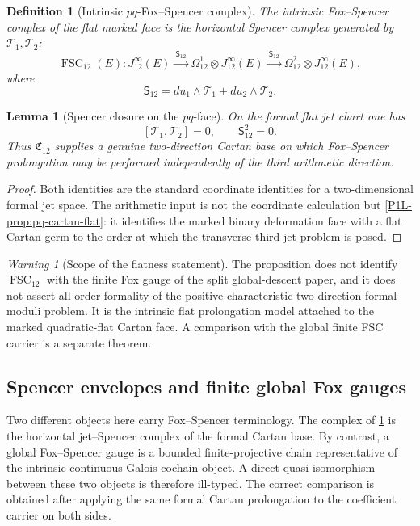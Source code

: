\documentclass[11pt]{article}
\newtheorem{lemma}[theorem]{Lemma}
\newtheorem{definition}[theorem]{Definition}
\theoremstyle{remark}
\newtheorem{warning}[theorem]{Warning}
\begin{document}
\begin{definition}[Intrinsic \(pq\)-Fox--Spencer complex]
\label{P1L-def:pq-fs}
The intrinsic Fox--Spencer complex of the flat marked face is the horizontal
Spencer complex generated by \(\mathcal T_1,\mathcal T_2\):
\[
 \operatorname{FSC}_{12}(E):
 J^\infty_{12}(E)
 \xrightarrow{\ \mathsf S_{12}\ }
 \Omega^1_{12}\otimes J^\infty_{12}(E)
 \xrightarrow{\ \mathsf S_{12}\ }
 \Omega^2_{12}\otimes J^\infty_{12}(E),
\]
where
\[
 \mathsf S_{12}
 =du_1\wedge\mathcal T_1+du_2\wedge\mathcal T_2.
\]
\end{definition}

\begin{lemma}[Spencer closure on the \(pq\)-face]
\label{P1L-prop:pq-spencer-closure}
On the formal flat jet chart one has
\[
 [\mathcal T_1,\mathcal T_2]=0,
 \qquad
 \mathsf S_{12}^2=0.
\]
Thus \(\mathfrak C_{12}\) supplies a genuine two-direction Cartan base on
which Fox--Spencer prolongation may be performed independently of the third
arithmetic direction.
\end{lemma}

\begin{proof}
Both identities are the standard coordinate identities for a two-dimensional
formal jet space.  The arithmetic input is not the coordinate calculation but
\cref{P1L-prop:pq-cartan-flat}: it identifies the marked binary deformation face
with a flat Cartan germ to the order at which the transverse third-jet problem
is posed.
\end{proof}

\begin{warning}[Scope of the flatness statement]\label{P1L-warn:pq-flat-scope}
The proposition does not identify \(\operatorname{FSC}_{12}\) with the finite
Fox gauge of the split global-descent paper, and it does not assert all-order
formality of the positive-characteristic two-direction formal-moduli problem.
It is the intrinsic flat prolongation model attached to the marked
quadratic-flat Cartan face.  A comparison with the global finite FSC carrier
is a separate theorem.
\end{warning}

\subsection{Spencer envelopes and finite global Fox gauges}

Two different objects here carry Fox--Spencer terminology.  The complex of
\cref{P1L-def:pq-fs} is the horizontal jet--Spencer complex of the formal Cartan
base.  By contrast, a global Fox--Spencer gauge is a bounded finite-projective chain
representative of the intrinsic continuous Galois cochain object.  A direct
quasi-isomorphism between these two objects is therefore ill-typed.  The
correct comparison is obtained after applying the same formal Cartan
prolongation to the coefficient carrier on both sides.
\end{document}
